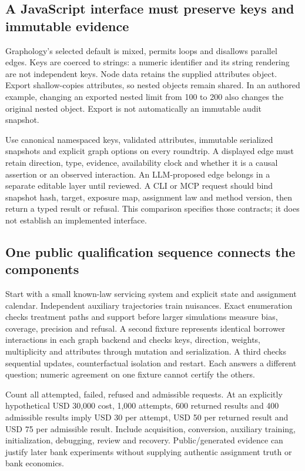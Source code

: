 \subsection{A JavaScript interface must preserve keys and immutable evidence}

Graphology's selected default is mixed, permits loops and disallows parallel
edges. Keys are coerced to strings: a numeric identifier and its string
rendering are not independent keys. Node data retains the supplied attributes
object. Export shallow-copies attributes, so nested objects remain shared.
In an authored example, changing an exported nested limit from 100 to 200 also
changes the original nested object. Export is not automatically an immutable
audit snapshot.~\citep{exec25_onet_graphology,exec25_onet_choice}

Use canonical namespaced keys, validated attributes, immutable serialized
snapshots and explicit graph options on every roundtrip. A displayed edge
must retain direction, type, evidence, availability clock and whether it is
a causal assertion or an observed interaction. An LLM-proposed edge belongs
in a separate editable layer until reviewed. A CLI or MCP request should bind
snapshot hash, target, exposure map, assignment law and method version, then
return a typed result or refusal. This comparison specifies those contracts;
it does not establish an implemented interface.
\citep{exec25_onet_graphology,exec25_onet_choice}

\subsection{One public qualification sequence connects the components}

Start with a small known-law servicing system and explicit state and assignment
calendar. Independent auxiliary trajectories train nuisances. Exact enumeration
checks treatment paths and support before larger simulations measure bias,
coverage, precision and refusal. A second fixture represents identical borrower
interactions in each graph backend and checks keys, direction, weights,
multiplicity and attributes through mutation and serialization. A third checks
sequential updates, counterfactual isolation and restart. Each answers a
different question; numeric agreement on one fixture cannot certify the others.
\citep{exec25_onet_choice}

Count all attempted, failed, refused and admissible requests. At an explicitly
hypothetical USD 30,000 cost, 1,000 attempts, 600 returned results and 400
admissible results imply USD 30 per attempt, USD 50 per returned result and
USD 75 per admissible result. Include acquisition,
conversion, auxiliary training, initialization, debugging, review and recovery.
Public/generated evidence can justify later bank experiments without supplying
authentic assignment truth or bank economics.~\citep{exec25_onet_choice}

